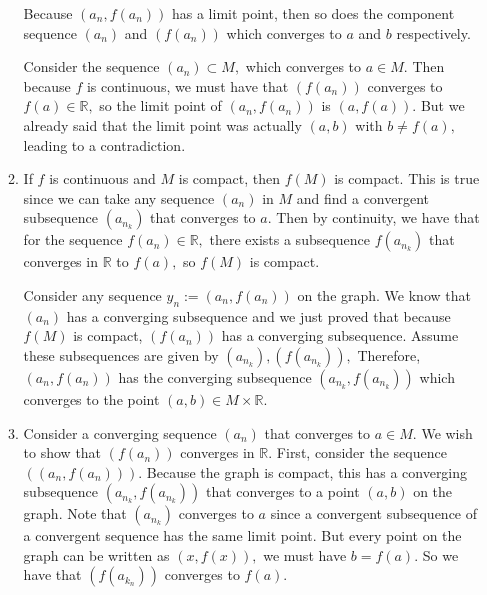 \documentclass{article}
\numberwithin{equation}{section}
\begin{document}
\begin{enumerate}
\begin{enumerate}[label=(\alph*)]
        Because $(a_n,f(a_n))$ has a limit point, then so does the component sequence $(a_n)$ and $(f(a_n))$ which converges to $a$ and $b$ respectively.

        Consider the sequence $(a_n) \subset M,$ which converges to $a\in M.$ Then because $f$ is continuous, we must have that $(f(a_n))$ converges to $f(a) \in \mathbb{R},$ so the limit point of $(a_n,f(a_n))$ is $(a,f(a)).$ But we already said that the limit point was actually $(a,b)$ with $b \neq f(a),$ leading to a contradiction.

        \item If $f$ is continuous and $M$ is compact, then $f(M)$ is compact. This is true since we can take any sequence $(a_n)$ in $M$ and find a convergent subsequence $(a_{n_k})$ that converges to $a.$ Then by continuity, we have that for the sequence $f(a_{n}) \in \mathbb{R},$ there exists a subsequence $f(a_{n_k})$ that converges in $\mathbb{R}$ to $f(a),$ so $f(M)$ is compact.
        
        Consider any sequence $y_n := (a_n, f(a_n))$ on the graph. We know that $(a_n)$ has a converging subsequence and we just proved that because $f(M)$ is compact, $(f(a_n))$ has a converging subsequence. Assume these subsequences are given by $(a_{n_k}),(f(a_{n_k})),$ Therefore, $(a_n,f(a_n))$ has the converging subsequence $(a_{n_k},f(a_{n_k}))$ which converges to the point $(a,b) \in M\times \mathbb{R}.$
        
        \item
        Consider a converging sequence $(a_n)$ that converges to $a \in M.$ We wish to show that $(f(a_n))$ converges in $\mathbb{R}.$ First, consider the sequence $((a_n,f(a_n))).$ Because the graph is compact, this has a converging subsequence $(a_{n_k},f(a_{n_k}))$ that converges to a point $(a,b)$ on the graph. Note that $(a_{n_k})$ converges to $a$ since a convergent subsequence of a convergent sequence has the same limit point. But every point on the graph can be written as $(x, f(x)),$ we must have $b=f(a).$ So we have that $(f(a_{k_n}))$ converges to $f(a).$


\end{enumerate}
\end{enumerate}
\end{document}
